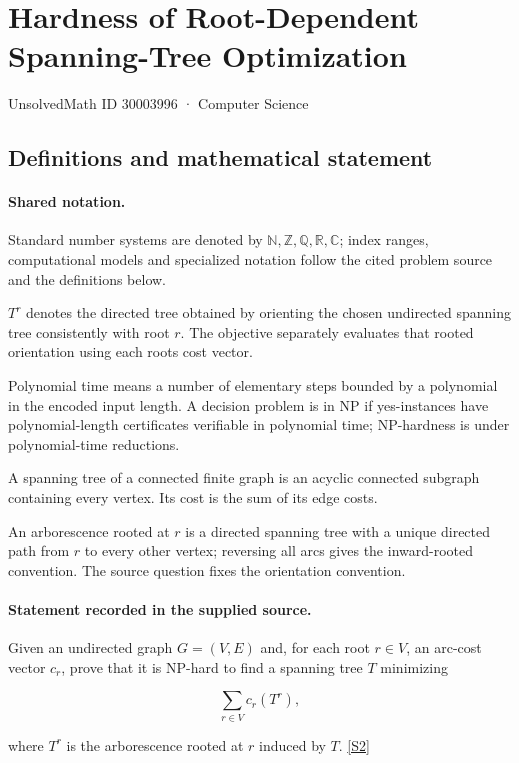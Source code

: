 \documentclass[11pt]{article}
\newcommand{\sref}[2]{\hyperlink{source:#1:#2}{[S#2]}}
\begin{document}
\setcounter{section}{30003995}
\section{Hardness of Root-Dependent Spanning-Tree Optimization}\label{30003996}
{\small\sffamily UnsolvedMath ID 30003996 · Computer Science}
\subsection{Definitions and mathematical statement}

\paragraph{Shared notation.}Standard number systems are denoted by $\mathbb N,\mathbb Z,\mathbb Q,\mathbb R,\mathbb C$; index ranges, computational models and specialized notation follow the cited problem source and the definitions below.


$T^r$ denotes the directed tree obtained by orienting the chosen undirected spanning tree consistently with root $r$. The objective separately evaluates that rooted orientation using each root\textquotesingle s cost vector.

Polynomial time means a number of elementary steps bounded by a polynomial in the encoded input length. A decision problem is in $\mathrm{NP}$ if yes-instances have polynomial-length certificates verifiable in polynomial time; NP-hardness is under polynomial-time reductions.

A spanning tree of a connected finite graph is an acyclic connected subgraph containing every vertex. Its cost is the sum of its edge costs.

An arborescence rooted at $r$ is a directed spanning tree with a unique directed path from $r$ to every other vertex; reversing all arcs gives the inward-rooted convention. The source question fixes the orientation convention.
\paragraph{Statement recorded in the supplied source.}
Given an undirected graph $G=(V,E)$ and, for each root $r\in V$, an arc-cost vector $c_r$, prove that it is NP-hard to find a spanning tree $T$ minimizing

$$\sum_{r\in V}c_r(T^r),$$

where $T^r$ is the arborescence rooted at $r$ induced by $T$. \sref{30003996}{2}
\end{document}

